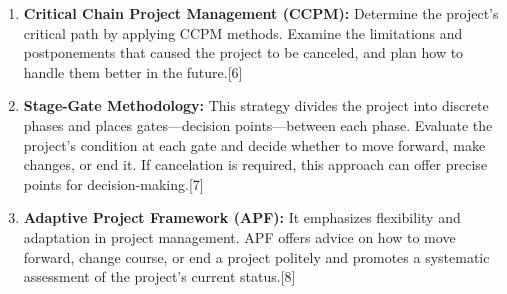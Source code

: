 \documentclass[11pt]{article}
\begin{document}
{\begin{enumerate}
        \item \textbf{Critical Chain Project Management (CCPM):} Determine the project's critical path by applying CCPM methods. Examine the limitations and postponements that caused the project to be canceled, and plan how to handle them better in the future.[6]

        \item \textbf{Stage-Gate Methodology:} This strategy divides the project into discrete phases and places gates—decision points—between each phase. Evaluate the project's condition at each gate and decide whether to move forward, make changes, or end it. If cancelation is required, this approach can offer precise points for decision-making.[7]

        \item \textbf{Adaptive Project Framework (APF):} It emphasizes flexibility and adaptation in project management. APF offers advice on how to move forward, change course, or end a project politely and promotes a systematic assessment of the project's current status.[8]

    \end{enumerate}
    
}
\end{document}
